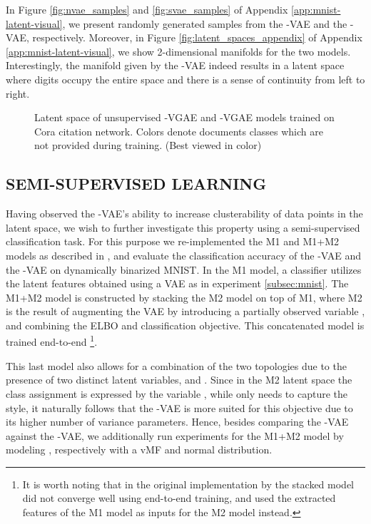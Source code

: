 \documentclass[letterpaper]{article}
\begin{document}
In Figure \ref{fig:nvae_samples} and \ref{fig:svae_samples} of Appendix \ref{app:mnist-latent-visual}, we present randomly generated samples from the \Nv-VAE and the \Sv-VAE, respectively. Moreover, in Figure \ref{fig:latent_spaces_appendix} of Appendix \ref{app:mnist-latent-visual}, we show 2-dimensional manifolds for the two models. Interestingly, the manifold given by the \Sv-VAE indeed results in a latent space where digits occupy the entire space and there is a sense of continuity from left to right.

\begin{figure*}[h!]
\centering
     \hspace{5em}
      \caption{Latent space of unsupervised \Nv-VGAE and \Sv-VGAE models trained on Cora citation network. Colors denote documents classes which are not provided during training. (Best viewed in color)}
\end{figure*}

\subsection{SEMI-SUPERVISED LEARNING} \label{subsec:m1}

Having observed the \Sv-VAE's ability to increase clusterability of data points in the latent space, we wish to further investigate this property using a semi-supervised classification task. For this purpose we re-implemented the M1 and M1+M2 models as described in \citep{kingma-semi-super}, and evaluate the classification accuracy of the \Sv-VAE and the \Nv-VAE on dynamically binarized MNIST. In the M1 model, a classifier utilizes the latent features obtained using a VAE as in experiment \ref{subsec:mnist}. The M1+M2 model is constructed by stacking the M2 model on top of M1, where M2 is the result of augmenting the VAE by introducing a partially observed variable , and combining the ELBO and classification objective. This concatenated model is trained end-to-end \footnote{It is worth noting that in the original implementation by \citet{kingma-semi-super} the stacked model did not converge well using end-to-end training, and used the extracted features of the M1 model as inputs for the M2 model instead.}. 

This last model also allows for a combination of the two topologies due to the presence of two distinct latent variables,  and . Since in the M2 latent space the class assignment is expressed by the variable , while  only needs to capture the style, it naturally follows that the \Nv-VAE is more suited for this objective due to its higher number of variance parameters. Hence, besides comparing the \Sv-VAE against the \Nv-VAE, we additionally run experiments for the M1+M2 model by modeling ,  respectively with a vMF and normal distribution.
\end{document}
